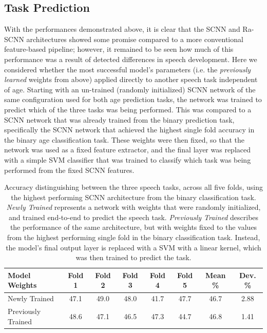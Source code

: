 \documentclass[fleqn,10pt]{wlscirep}
\begin{document}
\subsection*{Task Prediction}

With the performances demonstrated above, it is clear that the SCNN and Ra-SCNN architectures showed some promise compared to a more conventional feature-based pipeline; however, it remained to be seen how much of this performance was a result of detected differences in speech development. Here we considered whether the most successful model's parameters (i.e. the {\em previously learned} weights from above) applied directly to another speech task independent of age. Starting with an un-trained (randomly initialized) SCNN network of the same configuration used for both age prediction tasks, the network was trained to predict which of the three tasks was being performed. This was compared to a SCNN network that was already trained from the binary prediction task, specifically the SCNN network that achieved the highest single fold accuracy in the binary age classification task. These weights were then fixed, so that the network was used as a fixed feature extractor, and the final layer was replaced with a simple SVM classifier that was trained to classify which task was being performed from the fixed SCNN features.

\begin{table}[h]
 \caption{Accuracy distinguishing between the three speech tasks, across all five folds, using the highest performing SCNN architecture from the binary classification task. \textit{Newly Trained} represents a network with weights that were randomly initialized, and trained end-to-end to predict the speech task. \textit{Previously Trained} describes the performance of the same architecture, but with weights fixed to the values from the highest performing single fold in the binary classification task. Instead, the model's final output layer is replaced with a SVM with a linear kernel, which was then trained to predict the task.}
 \centering
 \begin{tabular}{l | c | c | c | c | c | c | c}
   \toprule
   \textbf{Model Weights} & \textbf{Fold 1} & \textbf{Fold 2} & \textbf{Fold 3} & \textbf{Fold 4} & \textbf{Fold 5} & \textbf{Mean \%} & \textbf{Dev. \%}\\
   \toprule
                        Newly Trained           & 47.1 & 49.0 & 48.0 & 41.7 & 47.7 & 46.7 & 2.88 \\
   \midrule
                        Previously Trained      & 48.6 & 47.1 & 46.5 & 47.3 & 44.7 & 46.8 & 1.41 \\ 
   \bottomrule
 \end{tabular}
 \label{tab:task_results}
\end{table}
\end{document}
